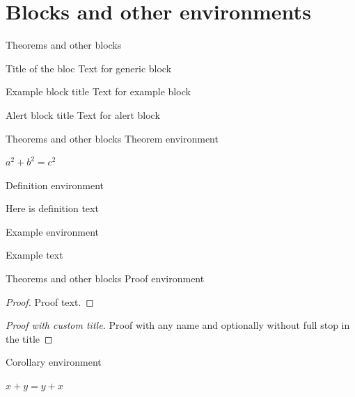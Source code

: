\documentclass[11pt,t]{beamer}
\begin{document}
	\section{Blocks and other environments}	\label{sec:blocks}
	\begin{frame}{Theorems and other blocks}
		\begin{block}{Title of the bloc}
			Text for generic block
		\end{block}

		\vspace{11pt}
		\begin{exampleblock}{Example block title}
			Text for example block
		\end{exampleblock}

		\vspace{11pt}
		\begin{alertblock}{Alert block title}
			Text for alert block
		\end{alertblock}
	\end{frame}




	\begin{frame}{Theorems and other blocks}
		Theorem environment
		\begin{theorem}
			$a^2 + b^2 = c^2$
		\end{theorem}

		\vspace{11pt}
		Definition environment
		\begin{definition}
			Here is definition text
		\end{definition}

		\vspace{11pt}
		Example environment
		\begin{example}
			Example text
		\end{example}
	\end{frame}




	\begin{frame}{Theorems and other blocks}
		Proof environment
		\begin{proof}
			Proof text.
		\end{proof}

		\begin{proof}[Proof with custom title\nopunct]
			Proof with any name and optionally without full stop in the title
		\end{proof}

		\vspace{11pt}
		Corollary environment
		\begin{corollary}
			$ x + y = y + x  $
		\end{corollary}
	\end{frame}
\end{document}
